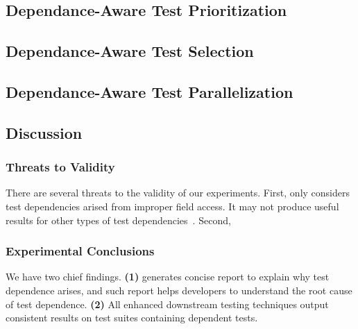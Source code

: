 \subsection{Dependance-Aware Test Prioritization}

\subsection{Dependance-Aware Test Selection}

\subsection{Dependance-Aware Test Parallelization}


\subsection{Discussion}

\subsubsection{Threats to Validity}

There are several threats to the validity
of our experiments. First, \dtexplain 
only considers test dependencies arised
from improper field access. It may not
produce useful results for other types of
test dependencies~\cite{}. Second,

\subsubsection{Experimental Conclusions}

We have two chief findings. \textbf{(1)} \dtexplain
generates concise report to explain why
test dependence arises, and such report
helps developers to understand the root cause
of test dependence. \textbf{(2)} All
enhanced downstream testing techniques
output consistent results on test suites
containing dependent tests.

